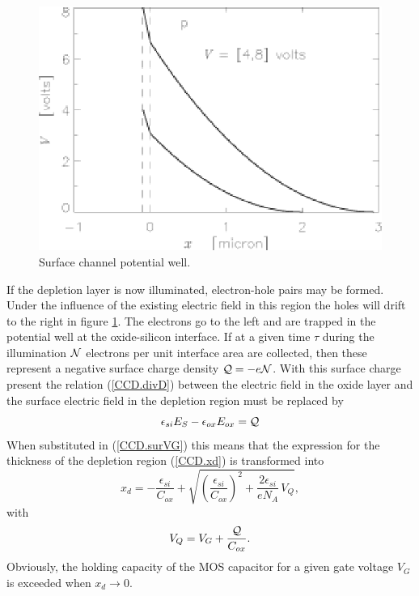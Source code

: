 \begin{figure}[h]
  \centering
	\includegraphics{CCD_surchan.eps}
  \caption{Surface channel potential well.}
  \label{CCD.figsurchan}
\end{figure}

If the depletion layer is now illuminated, electron-hole pairs may be
formed. Under the influence of the existing electric field in this
region the holes will drift to the right in figure
\ref{CCD.figsurchan}. The electrons go to the left and are trapped in
the potential well at the oxide-silicon interface. If at a given time
$\tau$ during the illumination ${\cal N}$ electrons per unit interface
area are collected, then these represent a negative surface charge
density ${\cal Q} = -e{\cal N}$. With this surface charge present the
relation (\ref{CCD.divD}) between the electric field in the oxide layer
and the surface electric field in the depletion region must be
replaced by
\begin{equation}
  \epsilon_{si} E_S - \epsilon_{ox} E_{ox} = {\cal Q}
\end{equation}
When substituted in (\ref{CCD.surVG}) this means that the expression
for the thickness of the depletion region (\ref{CCD.xd}) is
transformed into
\begin{equation}
  x_d = -\frac{\epsilon_{si}}{C_{ox}} +
  \sqrt{\left(\frac{\epsilon_{si}}{C_{ox}}\right)^2+\frac{2\epsilon_{si}}{eN_A} \, V_Q},
\end{equation}
with
\begin{equation}
  V_Q = V_G + \frac{{\cal Q}}{C_{ox}}.
\end{equation}
Obviously, the holding capacity of the MOS capacitor for a given gate
voltage $V_G$ is exceeded when $x_d \rightarrow 0$.

